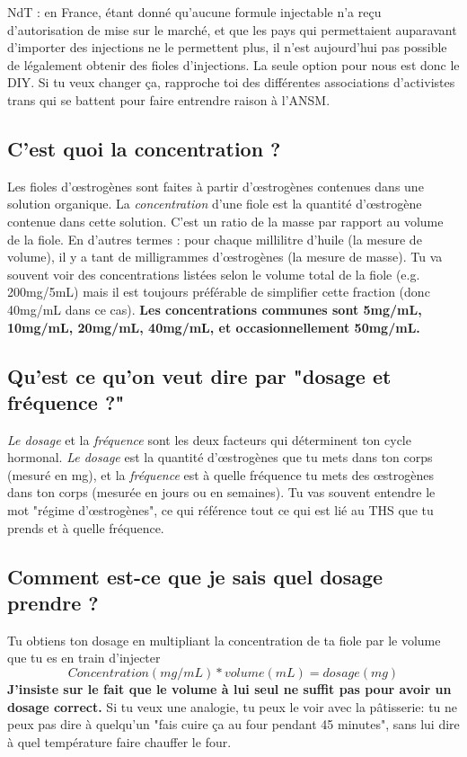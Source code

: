 \documentclass{article}
\begin{document}
NdT : en France, étant donné qu'aucune formule injectable n'a reçu d'autorisation de mise sur le marché, et que les pays qui permettaient auparavant d'importer des injections ne le permettent plus, il n'est aujourd'hui pas possible de légalement obtenir des fioles d'injections. La seule option pour nous est donc le DIY. Si tu veux changer ça, rapproche toi des différentes associations d'activistes trans qui se battent pour faire entrendre raison à l'ANSM.

\subsection{C'est quoi la concentration ?}

Les fioles d'œstrogènes sont faites à partir d'œstrogènes contenues dans une solution organique. La \textit{concentration} d'une fiole est la quantité d'œstrogène contenue dans cette solution. C'est un ratio de la masse par rapport au volume de la fiole. En d'autres termes : pour chaque millilitre d'huile (la mesure de volume), il y a tant de milligrammes d'œstrogènes (la mesure de masse). Tu va souvent voir des concentrations listées selon le volume total de la fiole (e.g. 200mg/5mL) mais il est toujours préférable de simplifier cette fraction (donc 40mg/mL dans ce cas). \textbf{Les concentrations communes sont 5mg/mL, 10mg/mL, 20mg/mL, 40mg/mL, et occasionnellement 50mg/mL.}

\subsection{Qu'est ce qu'on veut dire par "dosage et fréquence ?"}

\textit{Le dosage} et la \textit{fréquence} sont les deux facteurs qui déterminent ton cycle hormonal. \textit{Le dosage} est la quantité d'œstrogènes que tu mets dans ton corps (mesuré en mg), et la \textit{fréquence} est à quelle fréquence tu mets des œstrogènes dans ton corps (mesurée en jours ou en semaines). Tu vas souvent entendre le mot "régime d'œstrogènes", ce qui référence tout ce qui est lié au THS que tu prends et à quelle fréquence.

\subsection{Comment est-ce que je sais quel dosage prendre ?}

Tu obtiens ton dosage en multipliant la concentration de ta fiole par le volume que tu es en train d'injecter \[Concentration (mg/mL) * volume (mL) = dosage (mg)\] \textbf{J'insiste sur le fait que le volume à lui seul ne suffit pas pour avoir un dosage correct.} Si tu veux une analogie, tu peux le voir avec la pâtisserie: tu ne peux pas dire à quelqu'un "fais cuire ça au four pendant 45 minutes", sans lui dire à quel température faire chauffer le four.
\end{document}
